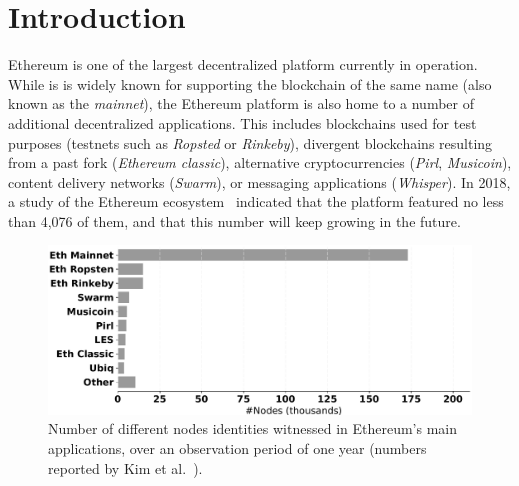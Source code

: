 
\section{Introduction}

Ethereum is one of  the largest decentralized platform currently in operation. 
While is is widely known for supporting the blockchain of the same name (also known as the \emph{mainnet}), the Ethereum platform is also home to a number of additional decentralized applications.
This includes blockchains used for test purposes (testnets such as \emph{Ropsted} or \emph{Rinkeby}), divergent blockchains resulting from a past fork (\emph{Ethereum classic}), alternative cryptocurrencies (\emph{Pirl}, \emph{Musicoin}), content delivery networks (\emph{Swarm}), or messaging applications (\emph{Whisper}). 
In 2018, a study of the Ethereum ecosystem~\cite{kim2018measuring} indicated that the platform featured no less than 4,076 of them, and that this number will keep growing in the future. 

\begin{figure}[t]
    \includegraphics[width=1\linewidth]{img/ecosystem}
    \caption{Number of different nodes identities witnessed in Ethereum's main applications, over an observation period of one year \protect{} (numbers reported by Kim et al.~\cite{kim2018measuring}).
    \protect{}
    \protect{}
    }
    \label{fig:ecosystem}
\end{figure}

